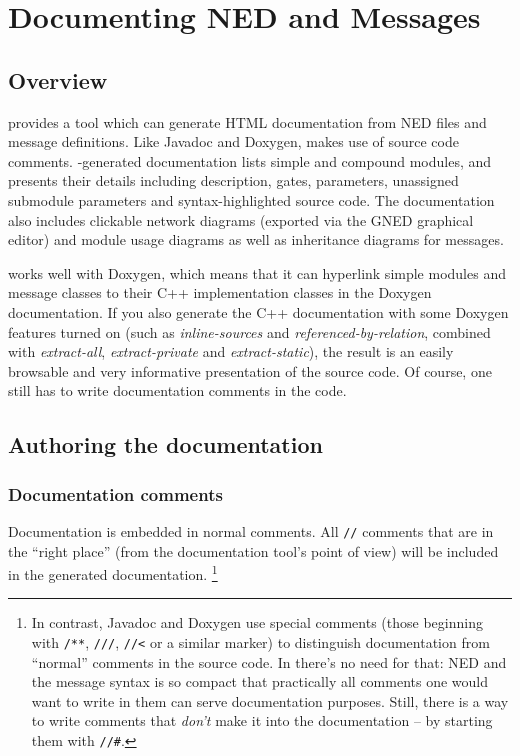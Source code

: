\chapter{Documenting NED and Messages}
\label{cha:neddoc}

\section{Overview}

{\opp} provides a tool which can generate HTML documentation from NED files
and message definitions. Like Javadoc and Doxygen, 
makes use of source code comments. -generated
documentation lists simple and compound modules, and presents their details
including description, gates, parameters, unassigned submodule parameters
and syntax-highlighted source code.
The documentation also includes clickable network diagrams (exported via the GNED
graphical editor) and module usage diagrams as well as inheritance diagrams
for messages.

 works well with Doxygen, which means that it can hyperlink
simple modules and message classes to their C++ implementation classes in
the Doxygen documentation. If you also generate the C++ documentation with some
Doxygen features turned on (such as \textit{inline-sources} and
\textit{referenced-by-relation}, combined with
\textit{extract-all}, \textit{extract-private} and \textit{extract-static}),
the result is an easily browsable and very informative presentation of the
source code. Of course, one still has to write documentation comments
in the code.



\section{Authoring the documentation}


\subsection{Documentation comments}

Documentation is embedded in normal comments. All \texttt{//} comments
that are in the ``right place'' (from the documentation tool's
point of view) will be included in the generated documentation.
  \footnote{In contrast, Javadoc and Doxygen use special comments (those
     beginning with \texttt{/**}, \texttt{///}, \texttt{//<} or a similar
     marker) to distinguish documentation from ``normal'' comments in the
     source code. In {\opp} there's no need for that: NED and the message
     syntax is so compact that practically all comments one would want to write
     in them can serve documentation purposes. Still, there is a way to write
     comments that \textit{don't} make it into the documentation -- by starting
     them with \texttt{//\#}.}

